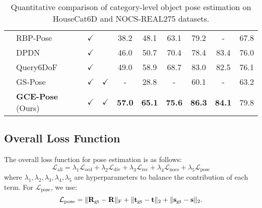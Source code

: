 \begin{table*}[h]
{\begin{tabular}{l|l|c c|c c c c | c c}
& RBP-Pose~\cite{zhang2022rbp} & \(\checkmark\) &   & 38.2 & 48.1 & 63.1 & 79.2   & -    &   67.8   \\
& DPDN~\cite{lin2022category} & \(\checkmark\) &    & 46.0 & 50.7 &  70.4    & 78.4    & 83.4    &  76.0 \\
& Query6DoF~\cite{query6dof}  & \(\checkmark\) &   & 49.0   & 58.9 & 68.7 & 83.0 & 82.5 & 76.1   \\
& GS-Pose~\cite{wang2025gs}         & \(\checkmark\) & \(\checkmark\)  & -    & 28.8 & -    & 60.1   & -    & 63.2  \\
&\textbf{GCE-Pose} (Ours)  & \(\checkmark\) & \(\checkmark\) & \textbf{57.0} & \textbf{65.1} & \textbf{75.6} &
\textbf{86.3}  & \textbf{84.1} & 79.8\\
\hline
\hline
\end{tabular}%
}
\vspace{-0.2cm}
\caption{Quantitative comparison of category-level object pose estimation on HouseCat6D and NOCS-REAL275 datasets.}
\vspace{-0.5cm}
\label{tab:merged_results}
\end{table*}


\subsection{Overall Loss Function} \label{subsec:pse}
The overall loss function for pose estimation is as follows:
\begin{equation}
\mathcal{L}_{\text{all}} = \lambda_1 \mathcal{L}_{\text{ocd}} + \lambda_2 \mathcal{L}_{\text{div}} + \lambda_3 \mathcal{L}_{\text{rec}} + \lambda_4 \mathcal{L}_{\text{nocs}} + \lambda_5 \mathcal{L}_{\text{pose}}
\label{equ:overall_loss}
\end{equation}
where $\lambda_1, \lambda_2, \lambda_3, \lambda_4, \lambda_5$ are hyperparameters to balance the contribution of each term. For $\mathcal{L}_{\text{pose}}$, we use:
\begin{equation}
\mathcal{L}_{\text{pose}} = \|\mathbf{R}_{\text{gt}} - \mathbf{R}\|_{\rm F} + \|\mathbf{t}_{\text{gt}} - \mathbf{t}\|_2 + \|\mathbf{s}_{\text{gt}} - \mathbf{s}\|_2.
\end{equation}

